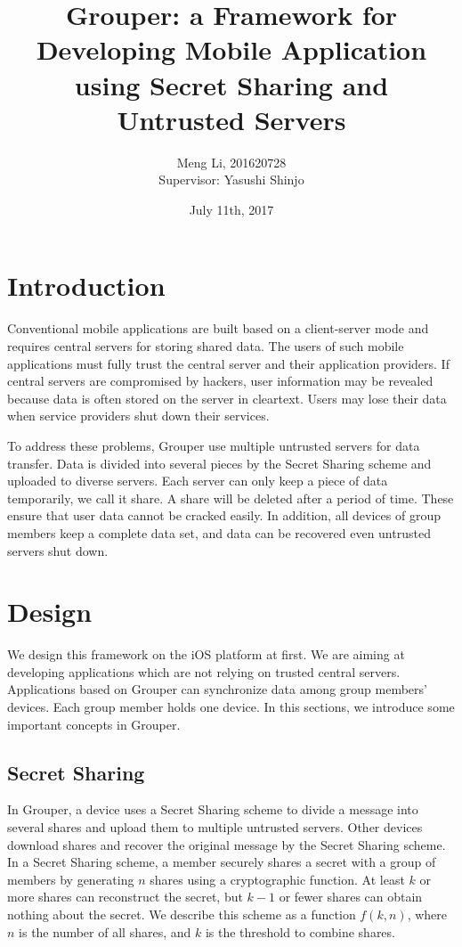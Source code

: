 \documentclass[twocolumn,10pt]{article}
\begin{document}
\small
\date{July 11th, 2017}

\title{\bf Grouper: a Framework for Developing Mobile Application using Secret Sharing and Untrusted Servers}

\author{
	Meng Li, 201620728  
	\\ Supervisor: Yasushi Shinjo
}

\maketitle

\section{Introduction}
Conventional mobile applications are built based on a client-server mode and
requires central servers for storing shared data. The users of such mobile applications must fully trust the central server and their application providers. If central servers are compromised by hackers, user information may be revealed because data is often stored on the server in cleartext. Users may lose their data when service providers shut down their services. 

To address these problems, Grouper use multiple untrusted servers for data transfer. Data is divided into several pieces by the Secret Sharing scheme and uploaded to diverse servers. Each server can only keep a piece of data temporarily, we call it share. A share will be deleted after a period of time. These ensure that user data cannot be cracked easily. In addition, all devices of group members keep a complete data set, and data can be recovered even untrusted servers shut down.

\section{Design}
We design this framework on the iOS platform at first. We are aiming at developing applications which are not relying on trusted central servers. Applications based on Grouper can synchronize data among group members' devices. Each group member holds one device. In this sections, we introduce some important concepts in Grouper.

\subsection{Secret Sharing}
In Grouper, a device uses a Secret Sharing scheme to divide a message into several shares and upload them to multiple untrusted servers. Other devices download shares and recover the original message by the Secret Sharing scheme. In a Secret Sharing scheme, a member securely shares a secret with a group of members by generating $n$ shares using a cryptographic function\cite{smith2013layered}. At least $k$ or more shares can reconstruct the secret, but $k-1$ or fewer shares can obtain nothing about the secret\cite{pang2005new}. We describe this scheme as a function $f(k, n)$, where $n$ is the number of all shares, and $k$ is the threshold to combine shares. 
\end{document}
